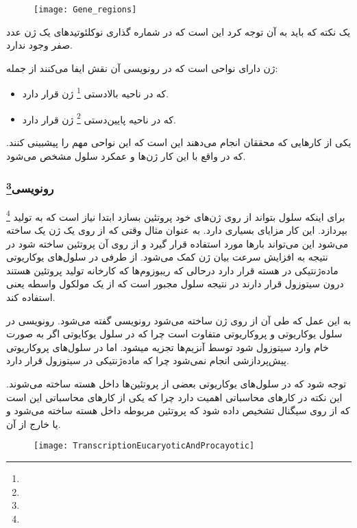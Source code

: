 \begin{figure}[htbp]
\centering
\texttt{[image: Gene\_regions]}
\end{figure}

\noindent
یک نکته که باید به آن توجه کرد این است که در شماره گذاری نوکلئوتید‌های یک ژن عدد صفر وجود ندارد.

\noindent
ژن دارای نواحی است که در رونویسی آن نقش ایفا می‌کنند از جمله:
\begin{itemize}
\item {}
که در ناحیه بالادستی
\footnote{}
ژن قرار دارد.
\item {}
که در ناحیه پایین‌دستی
\footnote{}
ژن قرار دارد.
\end{itemize}

\noindent
یکی از کارهایی که محققان انجام می‌دهند این است که این نواحی مهم را پیشبینی ‌‌کنند. که در واقع با این کار ژن‌ها و عمکرد سلول مشخص می‌شود.

\pagebreak
\subsubsection{رونویسی\protect\footnote{}}
برای اینکه سلول بتواند از روی ژن‌های خود پروتئین بسازد ابتدا نیاز است که به تولید
\footnote{}
بپردازد. این کار مزایای بسیاری دارد. به عنوان مثال وقتی که از روی یک ژن یک
ساخته می‌شود این
می‌تواند بار‌ها مورد استفاده قرار گیرد و از روی آن پروتئین ساخته شود در نتیجه به افزایش سرعت بیان ژن کمک می‌شود. از طرفی در سلول‌های یوکاریوتی ماده‌ژنتیکی در هسته قرار دارد درحالی که ریبوزوم‌ها که کارخانه تولید پروتئین هستند درون سیتوزول قرار دارند در نتیجه سلول مجبور است که از یک مولکول واسطه یعنی
استفاده کند.

به این عمل که طی آن از روی ژن
ساخته می‌شود رونویسی گفته می‌شود. رونویسی در سلول یوکاریوتی و پروکاریوتی متفاوت است چرا که در سلول یوکایوتی اگر
به صورت خام وارد سیتوزول شود توسط آنزیم‌ها تجزیه میشود. اما در سلول‌های پروکاریوتی پیش‌پردازشی انجام نمی‌شود چرا که ماده‌ژنتیکی در سیتوزول قرار دارد.

توجه شود که در سلول‌های یوکاریوتی بعضی از پروتئین‌ها داخل هسته ساخته می‌شوند. این نکته در کارهای محاسباتی اهمیت دارد چرا که یکی از کار‌های محاسباتی این است که از روی سیگنال تشخیص داده شود که پروتئین مربوطه داخل هسته ساخته می‌شود و یا خارج از آن.

\begin{figure}[htbp]
	\centering
	\texttt{[image: TranscriptionEucaryoticAndProcayotic]}
\end{figure}

